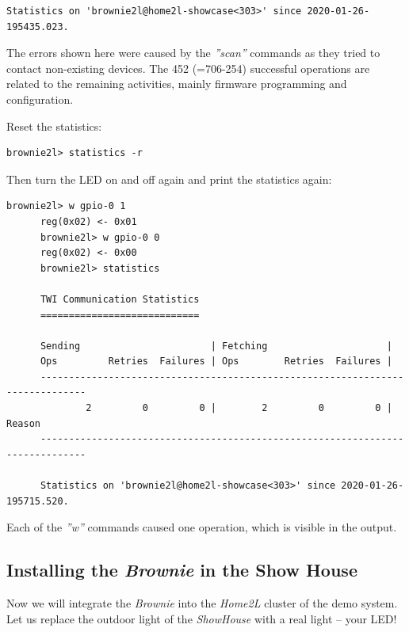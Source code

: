 \documentclass[12pt,english,parskip=half,headheight=19pt]{scrreprt}
\begin{document}
\begin{itemize}[$\blacktriangleright$]
\begin{lstlisting}[language=brownie2l]
      Statistics on 'brownie2l@home2l-showcase<303>' since 2020-01-26-195435.023.

    \end{lstlisting}
    The errors shown here were caused by the \textit{''scan''} commands as they tried to contact non-existing
    devices. The 452 (=706-254) successful operations are related to the remaining activities, mainly
    firmware programming and configuration.

    Reset the statistics:
    \begin{lstlisting}[language=brownie2l]
      brownie2l> statistics -r
    \end{lstlisting}
    Then turn the LED on and off again and print the statistics again:
    \begin{lstlisting}[language=brownie2l]
      brownie2l> w gpio-0 1
      reg(0x02) <- 0x01
      brownie2l> w gpio-0 0
      reg(0x02) <- 0x00
      brownie2l> statistics

      TWI Communication Statistics
      ============================

      Sending                       | Fetching                     |
      Ops         Retries  Failures | Ops        Retries  Failures |
      ------------------------------------------------------------------------------
              2         0         0 |        2         0         0 | Reason
      ------------------------------------------------------------------------------

      Statistics on 'brownie2l@home2l-showcase<303>' since 2020-01-26-195715.520.
    \end{lstlisting}
    Each of the \textit{''w''} commands caused one operation, which is visible in the output.
\end{itemize}



\subsection{Installing the \textit{Brownie} in the Show House}
\label{sec:tutorial-brownies-resources}

Now we will integrate the \textit{Brownie} into the \textit{Home2L} cluster of the demo system.
Let us replace the outdoor light of the \textit{ShowHouse} with a real light -- your LED!
\end{document}
